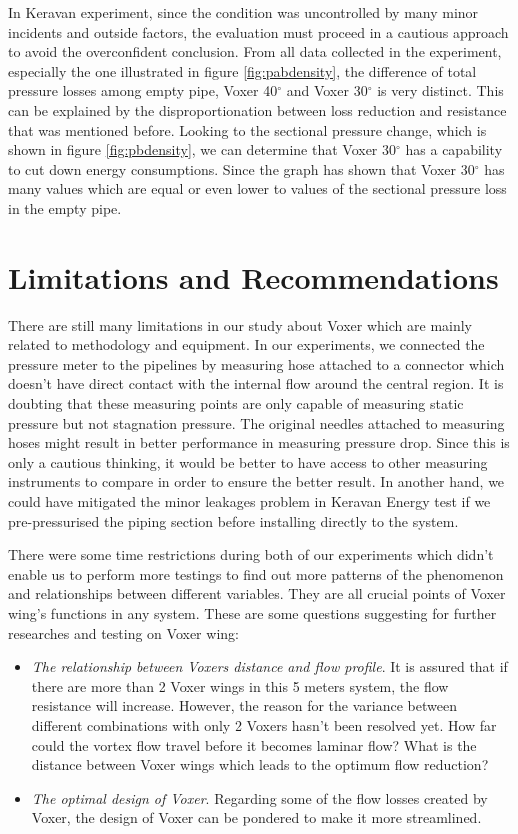 In Keravan experiment, since the condition was uncontrolled by many minor incidents and outside factors, the evaluation must proceed in a cautious approach to avoid the overconfident conclusion. From all data collected in the experiment, especially the one illustrated in figure \ref{fig:pabdensity}, the difference of total pressure losses among empty pipe, Voxer 40$^{\circ}$ and Voxer 30$^{\circ}$ is very distinct. This can be explained by the disproportionation between loss reduction and resistance that was mentioned before. Looking to the sectional pressure change, which is shown in figure \ref{fig:pbdensity}, we can determine that Voxer 30$^{\circ}$ has a capability to cut down energy consumptions. Since the graph has shown that Voxer 30$^{\circ}$ has many values which are equal or even lower to values of the sectional pressure loss in the empty pipe.

\section{Limitations and Recommendations}

There are still many limitations in our study about Voxer which are mainly related to methodology and equipment. In our experiments, we connected the pressure meter to the pipelines by measuring hose attached to a connector which doesn't have direct contact with the internal flow around the central region. It is doubting that these measuring points are only capable of measuring static pressure but not stagnation pressure. The original needles \cite{danfoss:web} attached to measuring hoses might result in better performance in measuring pressure drop. Since this is only a cautious thinking, it would be better to have access to other measuring instruments to compare in order to ensure the better result. In another hand, we could have mitigated the minor leakages problem in Keravan Energy test if we pre-pressurised the piping section before installing directly to the system. 

There were some time restrictions during both of our experiments which didn't enable us to perform more testings to find out more patterns of the phenomenon and relationships between different variables. They are all crucial points of Voxer wing's functions in any system. These are some questions suggesting for further researches and testing on Voxer wing:
\begin{itemize}
  \item \textit{The relationship between Voxers distance and flow profile}. It is assured that if there are more than 2 Voxer wings in this 5 meters system, the flow resistance will increase. However, the reason for the variance between different combinations with only 2 Voxers hasn't been resolved yet. How far could the vortex flow travel before it becomes laminar flow? What is the distance between Voxer wings which leads to the optimum flow reduction? 
  \item \textit{The optimal design of Voxer}. Regarding some of the flow losses created by Voxer, the design of Voxer can be pondered to make it more streamlined. 
\end{itemize} 

